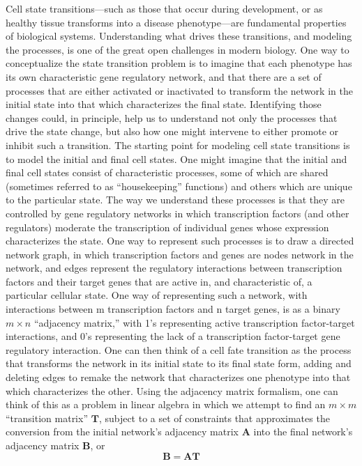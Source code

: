\documentclass[english]{article}
\begin{document}
Cell state transitions—such as those that occur during development,
or as healthy tissue transforms into a disease phenotype—are fundamental
properties of biological systems. Understanding what drives these
transitions, and modeling the processes, is one of the great open
challenges in modern biology. One way to conceptualize the state transition
problem is to imagine that each phenotype has its own characteristic
gene regulatory network, and that there are a set of processes that
are either activated or inactivated to transform the network in the
initial state into that which characterizes the final state. Identifying
those changes could, in principle, help us to understand not only
the processes that drive the state change, but also how one might
intervene to either promote or inhibit such a transition. The starting
point for modeling cell state transitions is to model the initial
and final cell states. One might imagine that the initial and final
cell states consist of characteristic processes, some of which are
shared (sometimes referred to as “housekeeping” functions) and others
which are unique to the particular state. The way we understand these
processes is that they are controlled by gene regulatory networks
in which transcription factors (and other regulators) moderate the
transcription of individual genes whose expression characterizes the
state. One way to represent such processes is to draw a directed network
graph, in which transcription factors and genes are nodes network
in the network, and edges represent the regulatory interactions between
transcription factors and their target genes that are active in, and
characteristic of, a particular cellular state. One way of representing
such a network, with interactions between m transcription factors
and n target genes, is as a binary $m\times n$ “adjacency matrix,”
with 1’s representing active transcription factor-target interactions,
and 0’s representing the lack of a transcription factor-target gene
regulatory interaction. One can then think of a cell fate transition
as the process that transforms the network in its initial state to
its final state form, adding and deleting edges to remake the network
that characterizes one phenotype into that which characterizes the
other. Using the adjacency matrix formalism, one can think of this
as a problem in linear algebra in which we attempt to find an $m\times m$
“transition matrix” $\mathbf{T}$, subject to a set of constraints
that approximates the conversion from the initial network’s adjacency
matrix \textbf{$\mathbf{A}$} into the final network’s adjacency matrix
$\mathbf{B}$, or 
\[
\mathbf{B}=\mathbf{AT}
\]
\end{document}
